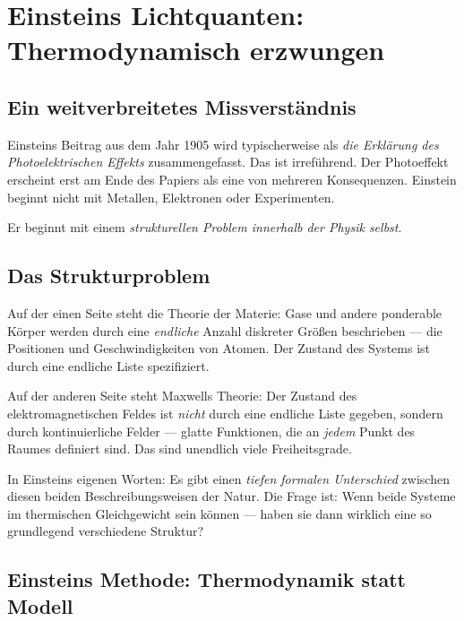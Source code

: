 \clearpage

\section{Einsteins Lichtquanten: Thermodynamisch erzwungen}
\label{sec:einstein}

\subsection{Ein weitverbreitetes Missverständnis}

Einsteins Beitrag aus dem Jahr 1905 wird typischerweise als \emph{die Erklärung des 
Photoelektrischen Effekts} zusammengefasst. Das ist irreführend. Der Photoeffekt 
erscheint erst am Ende des Papiers als eine von mehreren Konsequenzen. Einstein beginnt 
nicht mit Metallen, Elektronen oder Experimenten.

Er beginnt mit einem \emph{strukturellen Problem innerhalb der Physik selbst}.

\subsection{Das Strukturproblem}

Auf der einen Seite steht die Theorie der Materie: Gase und andere ponderable Körper 
werden durch eine \emph{endliche} Anzahl diskreter Größen beschrieben — die Positionen 
und Geschwindigkeiten von Atomen. Der Zustand des Systems ist durch eine endliche 
Liste spezifiziert.

Auf der anderen Seite steht Maxwells Theorie: Der Zustand des elektromagnetischen 
Feldes ist \emph{nicht} durch eine endliche Liste gegeben, sondern durch kontinuierliche 
Felder — glatte Funktionen, die an \emph{jedem} Punkt des Raumes definiert sind. 
Das sind unendlich viele Freiheitsgrade.

In Einsteins eigenen Worten: Es gibt einen \emph{tiefen formalen Unterschied} zwischen 
diesen beiden Beschreibungsweisen der Natur. Die Frage ist: Wenn beide Systeme im 
thermischen Gleichgewicht sein können — haben sie dann wirklich eine so grundlegend 
verschiedene Struktur?

\subsection{Einsteins Methode: Thermodynamik statt Modell}

